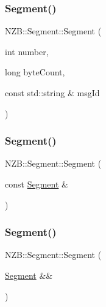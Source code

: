 \hypertarget{class_n_z_b_1_1_segment_a226cb3162ca909d5aa8b0a7d1abc3f40}{}\label{class_n_z_b_1_1_segment_a226cb3162ca909d5aa8b0a7d1abc3f40} 
\subsubsection{\texorpdfstring{Segment()}{Segment()}\hspace{0.1cm}{\footnotesize\ttfamily [3/5]}}
{\footnotesize\ttfamily N\+Z\+B\+::\+Segment\+::\+Segment (\begin{DoxyParamCaption}\item[{int}]{number,  }\item[{long}]{byte\+Count,  }\item[{const std\+::string \&}]{msg\+Id }\end{DoxyParamCaption})}

\hypertarget{class_n_z_b_1_1_segment_ab892c1d1a6a00b5267de13dc2a08aac8}{}\label{class_n_z_b_1_1_segment_ab892c1d1a6a00b5267de13dc2a08aac8} 
\subsubsection{\texorpdfstring{Segment()}{Segment()}\hspace{0.1cm}{\footnotesize\ttfamily [4/5]}}
{\footnotesize\ttfamily N\+Z\+B\+::\+Segment\+::\+Segment (\begin{DoxyParamCaption}\item[{const \hyperlink{class_n_z_b_1_1_segment}{Segment} \&}]{ }\end{DoxyParamCaption})\hspace{0.3cm}{\ttfamily [default]}}

\hypertarget{class_n_z_b_1_1_segment_a5c32e73629aa5a70e1a0bdaa819607e4}{}\label{class_n_z_b_1_1_segment_a5c32e73629aa5a70e1a0bdaa819607e4} 
\subsubsection{\texorpdfstring{Segment()}{Segment()}\hspace{0.1cm}{\footnotesize\ttfamily [5/5]}}
{\footnotesize\ttfamily N\+Z\+B\+::\+Segment\+::\+Segment (\begin{DoxyParamCaption}\item[{\hyperlink{class_n_z_b_1_1_segment}{Segment} \&\&}]{ }\end{DoxyParamCaption})\hspace{0.3cm}{\ttfamily [default]}}

